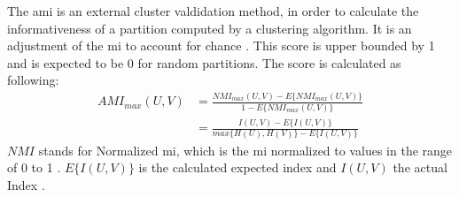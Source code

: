The \acrshort{ami} is an external cluster valdidation method, in order to calculate the informativeness of a partition computed by a clustering algorithm. It is an adjustment of the \acrfull{mi} to account for chance \cite{scikitlearn}. This score is upper bounded by 1 and is expected to be 0 for random partitions. The score is calculated as following: \cite{ari_form}
\begin{align}
    AMI_{max}(U,V) &= \frac{NMI_{max}(U,V)-E\{NMI_{max}(U,V)\}}{1-E\{NMI_{max}(U,V)\}}\\ &= \frac{I(U,V)-E\{I(U,V)\}}{max\{H(U), H(V)\}-E\{I(U,V)\}}
\end{align}
$NMI$ stands for Normalized \acrshort{mi}, which is the \acrshort{mi} normalized to values in the range of 0 to 1 \cite{scikitlearn}. $E\{I(U,V)\}$ is the calculated expected index and $I(U,V)$ the actual Index \cite{ari_form}.